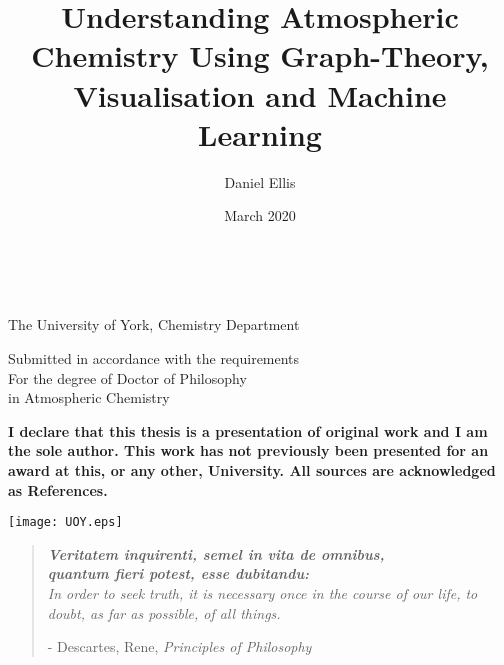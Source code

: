 \documentclass[twoside,openleft,reqno,a4paper,final]{book}
\title{Understanding Atmospheric Chemistry Using Graph-Theory, Visualisation and Machine Learning}
\author{Daniel Ellis}
\date{March 2020}
\makeatletter
\def\blankpage{%
      \clearpage%
      \thispagestyle{empty}%
      \addtocounter{page}{0}%
      \null%
      \clearpage}
\renewcommand{\maketitle}{

\thispagestyle{empty}
\begin{center}
\pagestyle{empty}
\phantom{.}  %
\vspace{1.5cm}

{\Huge \bf \@title\par}
\vspace{2cm}

{\LARGE \@author}\\[.7cm]

{\Large\@date}

\vspace{6cm}

The University of York, Chemistry Department

Submitted in accordance with the requirements\\
    For the degree of Doctor of Philosophy\\ in Atmospheric Chemistry

\vspace{1.3cm}


\textbf{I declare that this thesis is a presentation of original work and I am the sole author. This work has not previously been presented for an award at this, or any other, University. All sources are acknowledged as References.}

\vspace{1cm}
\texttt{[image: UOY.eps]}

\end{center}
}\makeatother
\makeatother
\begin{document}

\frontmatter
\titleformat{\paragraph}[hang]{\normalfont\normalsize\bfseries}{\theparagraph}{1em}{}



\setcounter{secnumdepth}{3}
\setcounter{tocdepth}{3}

 \maketitle




\cleardoublepage{}
\setlength{\footnotesep}{0.5cm}
\raggedbottom %

\restoregeometry
\vspace*{0.15\paperheight}
\begin{center}
\begin{quotation}
    \centering
  \large{\emph{\textbf{Veritatem inquirenti, semel in vita de omnibus,\\ quantum fieri potest, esse dubitandu:}\\
 In order to seek truth, it is necessary once in the course of our life, to doubt, as far as possible, of all things. }  }
\vspace{\baselineskip}\linebreak
  \begin{flushright}\small{
  - Descartes, Rene, \textit{Principles of Philosophy}
  }
\end{flushright}
 \end{quotation}
\end{center}


\newpage
\end{document}
